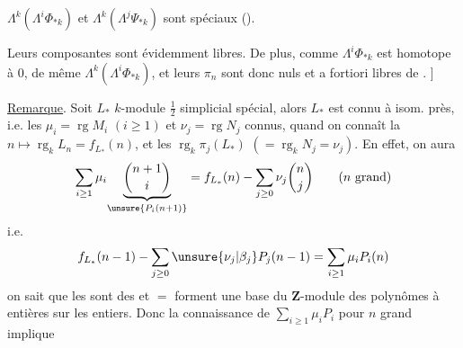 $\Lambda^k(\Lambda^i\Phi_{*k})$ et $\Lambda^k(\Lambda^j\Psi_{*k})$ sont spéciaux
().

Leurs composantes sont évidemment
libres. De plus, comme $\Lambda^i\Phi_{*k}$ est
homotope à $0$, de même $\Lambda^k(\Lambda^i\Phi_{*k})$, et
leurs $\pi_n$ sont donc nuls et a fortiori
libres de .
]

\uline{Remarque}. Soit $L_*$ $k$-module $\frac12$ simplicial
 spécial, alors $L_*$ est connu à isom. près,
i.e. les $\mu_i=\operatorname{rg}M_i$ $(i\geq1)$ et $\nu_j=\operatorname{rg}N_j$
 
connus, quand on connaît la 
$n\longmapsto\operatorname{rg}_kL_n=f_{L_*}(n)$,
 et les
$\operatorname{rg}_k\pi_j(L_*)$ $(=\operatorname{rg}_kN_j=\nu_j)$.
En effet,
on aura
\[
\sum_{i\geq1}\mu_i\underset{\unsure{P_i(n+1)}}{\underbrace{\binom{n+1}{i}}}
=f_{L_*}(n)-\sum_{j\geq0}\nu_j\binom{n}{j}
\qquad(n\text{ grand})
\]
i.e.
\[
f_{L_*}(n-1)-\sum_{j\geq0}\unsure{\nu_j|\beta_j}P_j(n-1)
=\sum_{i\geq1}\mu_iP_i(n)
\]
on sait que les  
sont des
 et $=$ forment une
base du $\mathbf Z$-module des polynômes
à   entières sur les entiers.
Donc la connaissance de $\sum_{i\geq1}\mu_iP_i$
pour $n$ grand implique
